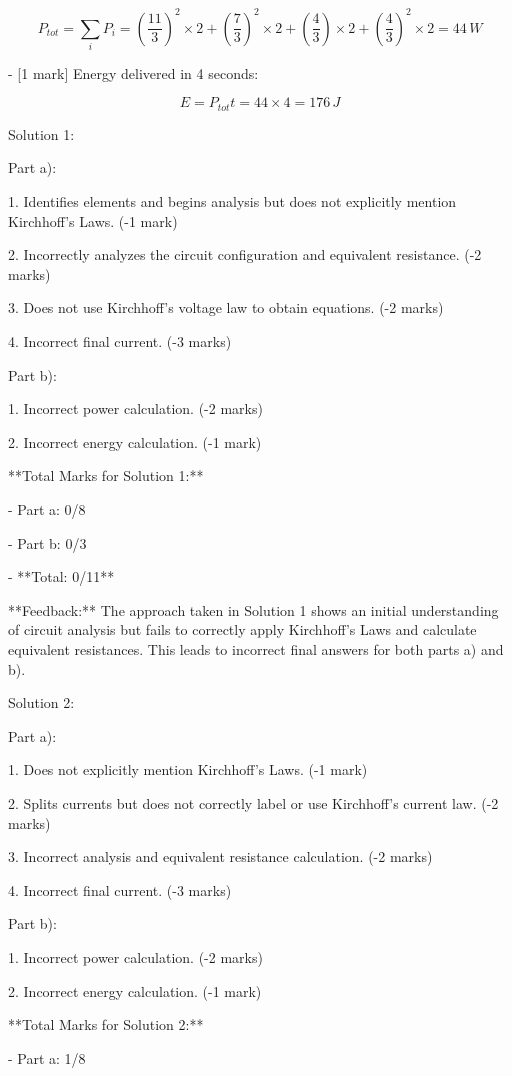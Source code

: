 \documentclass[a4paper,11pt]{article}
\begin{document}
\[ P_{tot} = \sum_{i} P_i = \left ( \frac{11}{3} \right )^2 \times 2 + \left ( \frac{7}{3} \right )^2 \times 2 + \left ( \frac{4}{3} \right ) \times 2 + \left ( \frac{4}{3} \right )^2 \times 2 = 44 \, W \]

- [1 mark] Energy delivered in 4 seconds:

\[ E = P_{tot} t = 44 \times 4 = 176 \, J \]

Solution 1:

Part a):

1. Identifies elements and begins analysis but does not explicitly mention Kirchhoff’s Laws. (-1 mark)

2. Incorrectly analyzes the circuit configuration and equivalent resistance. (-2 marks)

3. Does not use Kirchhoff's voltage law to obtain equations. (-2 marks)

4. Incorrect final current. (-3 marks)

Part b):

1. Incorrect power calculation. (-2 marks)

2. Incorrect energy calculation. (-1 mark)

**Total Marks for Solution 1:**

- Part a: 0/8

- Part b: 0/3

- **Total: 0/11**

**Feedback:** The approach taken in Solution 1 shows an initial understanding of circuit analysis but fails to correctly apply Kirchhoff’s Laws and calculate equivalent resistances. This leads to incorrect final answers for both parts a) and b).

Solution 2:

Part a):

1. Does not explicitly mention Kirchhoff’s Laws. (-1 mark)

2. Splits currents but does not correctly label or use Kirchhoff’s current law. (-2 marks)

3. Incorrect analysis and equivalent resistance calculation. (-2 marks)

4. Incorrect final current. (-3 marks)

Part b):

1. Incorrect power calculation. (-2 marks)

2. Incorrect energy calculation. (-1 mark)

**Total Marks for Solution 2:**

- Part a: 1/8
\end{document}
